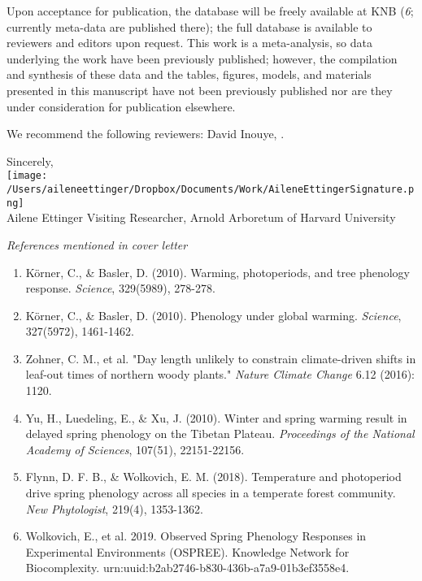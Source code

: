 \documentclass[11pt,a4paper]{letter}
\begin{document}
\begin{letter}{}
\par Upon acceptance for publication, the database will be freely available at KNB (\emph{6}; currently meta-data are published there); the full database is available to reviewers and editors upon request. This work is a meta-analysis, so data underlying the work have been previously published; however, the compilation and synthesis of these data and the tables, figures, models, and materials presented in this manuscript have not been previously published nor are they under consideration for publication elsewhere.

We recommend the following reviewers: David Inouye, .%


Sincerely,\\

\texttt{[image: /Users/aileneettinger/Dropbox/Documents/Work/AileneEttingerSignature.png]} \\
Ailene Ettinger
Visiting Researcher, Arnold Arboretum of Harvard University 

\noindent \emph{References mentioned in cover letter}
\begin{footnotesize}
\begin{enumerate}
\item K\"orner, C., \& Basler, D. (2010). Warming, photoperiods, and tree phenology response. \emph{Science}, 329(5989), 278-278.
\item K\"orner, C., \& Basler, D. (2010). Phenology under global warming. \emph{Science}, 327(5972), 1461-1462.
\item Zohner, C. M., et al. "Day length unlikely to constrain climate-driven shifts in leaf-out times of northern woody plants." \emph{Nature Climate Change} 6.12 (2016): 1120.
\item Yu, H., Luedeling, E., \& Xu, J. (2010). Winter and spring warming result in delayed spring phenology on the Tibetan Plateau. \emph{Proceedings of the National Academy of Sciences}, 107(51), 22151-22156.
\item Flynn, D. F. B., \& Wolkovich, E. M. (2018). Temperature and photoperiod drive spring phenology across all species in a temperate forest community. \emph{New Phytologist}, 219(4), 1353-1362.
\item Wolkovich, E., et al. 2019. Observed Spring Phenology Responses in Experimental Environments (OSPREE). Knowledge Network for Biocomplexity. urn:uuid:b2ab2746-b830-436b-a7a9-01b3ef3558e4. 
\end{enumerate}
\end{footnotesize}



\end{letter}
\end{document}
